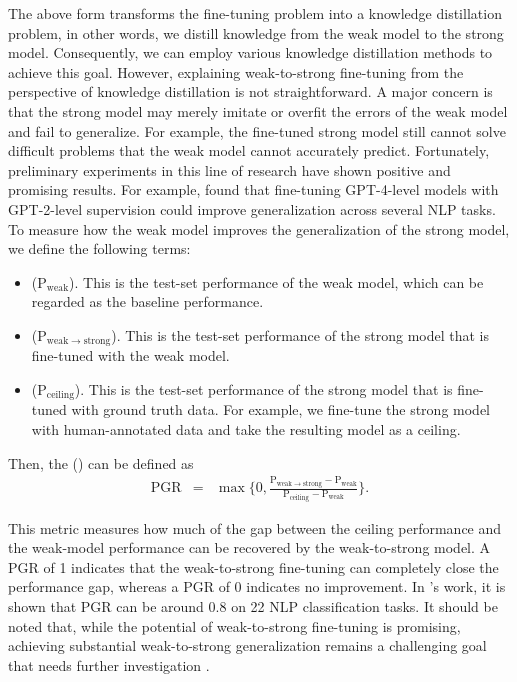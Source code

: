 The above form transforms the fine-tuning problem into a knowledge distillation problem, in other words, we distill knowledge from the weak model to the strong model. Consequently, we can employ various knowledge distillation methods to achieve this goal. However, explaining weak-to-strong fine-tuning from the perspective of knowledge distillation is not straightforward. A major concern is that the strong model may merely imitate or overfit the errors of the weak model and fail to generalize. For example, the fine-tuned strong model still cannot solve difficult problems that the weak model cannot accurately predict. Fortunately, preliminary experiments in this line of research have shown positive and promising results. For example, \citet{burns-etal:2023weak} found that fine-tuning GPT-4-level models with GPT-2-level supervision could improve generalization across several NLP tasks. To measure how the weak model improves the generalization of the strong model, we define the following terms:

\begin{itemize}
\item \vspace{0.5em}  ($\mathrm{P}_{\mathrm{weak}}$). This is the test-set performance of the weak model, which can be regarded as the baseline performance.
\item \vspace{0.3em}  ($\mathrm{P}_{\mathrm{weak} \to \mathrm{strong}}$). This is the test-set performance of the strong model that is fine-tuned with the weak model.
\item \vspace{0.3em}  ($\mathrm{P}_{\mathrm{ceiling}}$). This is the test-set performance of the strong model that is fine-tuned with ground truth data. For example, we fine-tune the strong model with human-annotated data and take the resulting model as a ceiling.
\end{itemize}
\vspace{0.5em}

Then, the  () can be defined as
\begin{eqnarray}
\mathrm{PGR} & = & \max \Big\{0, \frac{\mathrm{P}_{\mathrm{weak} \to \mathrm{strong}} - \mathrm{P}_{\mathrm{weak}}}{\mathrm{P}_{\mathrm{ceiling}} - \mathrm{P}_{\mathrm{weak}}} \Big\}.
\end{eqnarray}

This metric measures how much of the gap between the ceiling performance and the weak-model performance can be recovered by the weak-to-strong model. A PGR of 1 indicates that the weak-to-strong fine-tuning can completely close the performance gap, whereas a PGR of 0 indicates no improvement. In \citet{burns-etal:2023weak}'s work, it is shown that $\mathrm{PGR}$ can be around $0.8$ on 22 NLP classification tasks. It should be noted that, while the potential of weak-to-strong fine-tuning is promising, achieving substantial weak-to-strong generalization remains a challenging goal that needs further investigation \cite{aschenbrenner:2024situational}.

